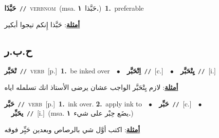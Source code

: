 \documentclass[10pt,a4paper,twoside]{article} %
\begin{document}
\begin{multicols}{2}
{\setlength\topsep{0pt}\textbf{\foreignlanguage{arabic}{حَبَّذَا}}\ {\color{gray}\texttt{//}\color{black}}\ \textsc{verb\textunderscore nom}\ \color{gray}(msa. \foreignlanguage{arabic}{حَبَّذا}~\foreignlanguage{arabic}{\textbf{١.}})\color{black}\ \textbf{1.}~preferable\  \begin{flushright}\color{gray}\foreignlanguage{arabic}{\textbf{\underline{\foreignlanguage{arabic}{أمثلة}}}: حَبَّذا إِنكم تيجوا أبكير}\end{flushright}\color{black}} \vspace{2mm}

\vspace{-3mm}
\subsection*{\color{blue}\foreignlanguage{arabic}{ح.ب.ر}\color{blue}{}} 

{\setlength\topsep{0pt}\textbf{\foreignlanguage{arabic}{تْحَبَّر}}\ {\color{gray}\texttt{//}\color{black}}\ \textsc{verb}\ [p.]\ \textbf{1.}~be inked over\ \ $\bullet$\ \ \setlength\topsep{0pt}\textbf{\foreignlanguage{arabic}{اِتْحَبَّر}}\ {\color{gray}\texttt{//}\color{black}}\ [c.]\ \ $\bullet$\ \ \setlength\topsep{0pt}\textbf{\foreignlanguage{arabic}{يِتْحَبَّر}}\ {\color{gray}\texttt{//}\color{black}}\ [i.]\  \begin{flushright}\color{gray}\foreignlanguage{arabic}{\textbf{\underline{\foreignlanguage{arabic}{أمثلة}}}: لازم يِتْحَبَّر الواجب عشان يرضى الأستاذ انك تسلمله اياه}\end{flushright}\color{black}} \vspace{2mm}

{\setlength\topsep{0pt}\textbf{\foreignlanguage{arabic}{حَبَّر}}\ {\color{gray}\texttt{//}\color{black}}\ \textsc{verb}\ [p.]\ \textbf{1.}~ink over.  \textbf{2.}~apply ink to\ \ $\bullet$\ \ \setlength\topsep{0pt}\textbf{\foreignlanguage{arabic}{حَبِّر}}\ {\color{gray}\texttt{//}\color{black}}\ [c.]\ \ $\bullet$\ \ \setlength\topsep{0pt}\textbf{\foreignlanguage{arabic}{يحَبِّر}}\ {\color{gray}\texttt{//}\color{black}}\ [i.]\ \color{gray}(msa. \foreignlanguage{arabic}{يضَع حِبْر على شيء}~\foreignlanguage{arabic}{\textbf{١.}})\color{black}\  \begin{flushright}\color{gray}\foreignlanguage{arabic}{\textbf{\underline{\foreignlanguage{arabic}{أمثلة}}}: اكتب أوَّل شي بالرصاص وبعدين حَبِِّر فوقه}\end{flushright}\color{black}} \vspace{2mm}


\end{multicols}
\end{document}
